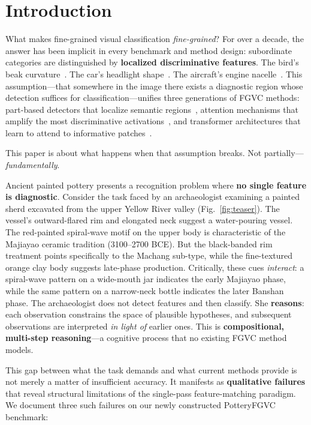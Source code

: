 \documentclass[10pt,twocolumn,letterpaper]{article}
\begin{document}
\section{Introduction}
\label{sec:intro}

What makes fine-grained visual classification \emph{fine-grained}? For over a decade, the answer has been implicit in every benchmark and method design: subordinate categories are distinguished by \textbf{localized discriminative features}. The bird's beak curvature~\cite{wah2011caltech}. The car's headlight shape~\cite{krause2013collecting}. The aircraft's engine nacelle~\cite{maji2013fine}. This assumption—that somewhere in the image there exists a diagnostic region whose detection suffices for classification—unifies three generations of FGVC methods: part-based detectors that localize semantic regions~\cite{zhang2014part, yang2018learning, du2020fine}, attention mechanisms that amplify the most discriminative activations~\cite{fu2017look, zheng2019looking, rao2021counterfactual}, and transformer architectures that learn to attend to informative patches~\cite{he2021transfg, xu2022vit}.

This paper is about what happens when that assumption breaks. Not partially—\emph{fundamentally}.

Ancient painted pottery presents a recognition problem where \textbf{no single feature is diagnostic}. Consider the task faced by an archaeologist examining a painted sherd excavated from the upper Yellow River valley (Fig.~\ref{fig:teaser}). The vessel's outward-flared rim and elongated neck suggest a water-pouring vessel. The red-painted spiral-wave motif on the upper body is characteristic of the Majiayao ceramic tradition (3100–2700 BCE). But the black-banded rim treatment points specifically to the Machang sub-type, while the fine-textured orange clay body suggests late-phase production. Critically, these cues \emph{interact}: a spiral-wave pattern on a wide-mouth jar indicates the early Majiayao phase, while the same pattern on a narrow-neck bottle indicates the later Banshan phase. The archaeologist does not detect features and then classify. She \textbf{reasons}: each observation constrains the space of plausible hypotheses, and subsequent observations are interpreted \emph{in light of} earlier ones. This is \textbf{compositional, multi-step reasoning}—a cognitive process that no existing FGVC method models.

This gap between what the task demands and what current methods provide is not merely a matter of insufficient accuracy. It manifests as \textbf{qualitative failures} that reveal structural limitations of the single-pass feature-matching paradigm. We document three such failures on our newly constructed PotteryFGVC benchmark:
\end{document}
